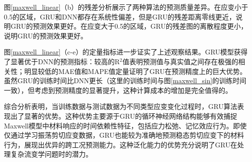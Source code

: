 图\ref{maxwell_linear}（b）的残差分析展示了两种算法的预测质量差异。在应变小于0.5的区域，GRU和DNN都存在系统性偏差，但是GRU的残差距离零线更近，说明GRU的预测效果更好。在应变大于0.5的区域，GRU的残差图的离散程度更小，说明GRU的预测效果更好。

图\ref{maxwell_linear}（c-e）的定量指标进一步证实了上述观察结果。GRU模型获得了显著优于DNN的预测指标：较高的R$^2$值表明预测值与真实值之间存在极强的相关性；明显较低的MAE值和MAPE值定量证明了GRU在预测精度上的巨大优势。虽然GRU的训练时间比DNN更长（这里的训练时间与图\ref{maxwell_sin}的训练时间一致），但考虑到预测精度的显著提升，这种计算成本的增加是完全值得的。

综合分析表明，当训练数据与测试数据为不同类型应变变化过程时，GRU算法表现出了显著的优势。这种优势主要源于GRU的循环神经网络结构能够有效捕捉Maxwell模型中材料响应的时间依赖性特征，包括应力松弛、记忆效应行为。即使仅通过学习振荡剪切应变数据，GRU也能较为准确地预测稳态剪切应变下的材料行为，展现出优异的跨工况预测能力。这种泛化能力的优势充分说明了GRU在处理复杂流变学问题时的潜力。
